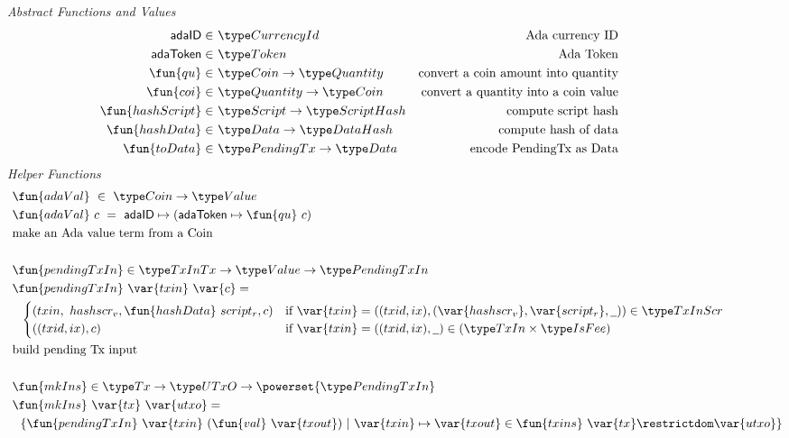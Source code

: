 \begin{figure*}[htb]
  \emph{Abstract Functions and Values}
  \begin{align*}
    \mathsf{adaID} \in& ~\CurrencyId
    & \text{Ada currency ID} \\
    \mathsf{adaToken} \in& ~\Token
    & \text{Ada Token} \\
    \fun{qu} \in& ~\Coin \to \Quantity
    & \text{convert a coin amount into quantity} \\
    \fun{coi} \in& ~\Quantity \to \Coin
    & \text{convert a quantity into a coin value} \\
    \fun{hashScript} \in & ~\Script\to \HashScr
    & \text{compute script hash} \\
    \fun{hashData} \in & ~\Data \to \HashDat
    & \text{compute hash of data} \\
    \fun{toData} \in & ~\PendingTx\to \Data
    & \text{encode PendingTx as Data} \\
  \end{align*}
  \emph{Helper Functions}
  \begin{align*}
    &\fun{adaVal} ~\in~ \Coin \to \Value \\
    &\fun{adaVal}~{c} ~=~ \mathsf{adaID} \mapsto (\mathsf{adaToken} \mapsto  \fun{qu}~c) \\
    & \text{make an Ada value term from a Coin} \\~\\
    & \fun{pendingTxIn} \in \TxInTx \to \Value \to \PendingTxIn \\
    & \fun{pendingTxIn}~\var{txin}~\var{c} = \\
    & ~~\begin{cases}
          (txin,~{hashscr_v},\fun{hashData}~{script_r},c)
           & \text{if}~\var{txin} = ((txid,ix),(\var{hashscr_v}, \var{script_r},\wcard)) \in \TxInScr \\
          ((txid,ix),c) & \text{if}~
           \var{txin} = ((txid,ix),\wcard) \in (\TxIn \times \IsFee)
      \end{cases}\\
    & \text{build pending Tx input} \\~\\
    & \fun{mkIns} \in \Tx \to \UTxO \to \powerset{\PendingTxIn} \\
    & \fun{mkIns}~\var{tx}~\var{utxo} = \\
    & ~~\{ \fun{pendingTxIn}~\var{txin}~(\fun{val}~\var{txout}) ~\vert~ \var{txin} \mapsto \var{txout}
    \in \fun{txins}~\var{tx} \restrictdom \var{utxo}\} \\

\end{align*}
\end{figure*}
